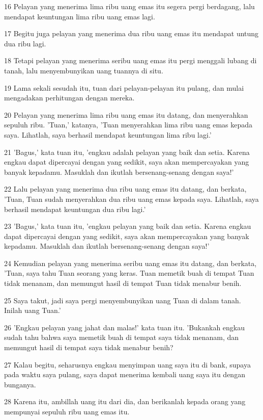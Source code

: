 \par 16 Pelayan yang menerima lima ribu uang emas itu segera pergi berdagang, lalu mendapat keuntungan lima ribu uang emas lagi.
\par 17 Begitu juga pelayan yang menerima dua ribu uang emas itu mendapat untung dua ribu lagi.
\par 18 Tetapi pelayan yang menerima seribu uang emas itu pergi menggali lubang di tanah, lalu menyembunyikan uang tuannya di situ.
\par 19 Lama sekali sesudah itu, tuan dari pelayan-pelayan itu pulang, dan mulai mengadakan perhitungan dengan mereka.
\par 20 Pelayan yang menerima lima ribu uang emas itu datang, dan menyerahkan sepuluh ribu. 'Tuan,' katanya, 'Tuan menyerahkan lima ribu uang emas kepada saya. Lihatlah, saya berhasil mendapat keuntungan lima ribu lagi.'
\par 21 'Bagus,' kata tuan itu, 'engkau adalah pelayan yang baik dan setia. Karena engkau dapat dipercayai dengan yang sedikit, saya akan mempercayakan yang banyak kepadamu. Masuklah dan ikutlah bersenang-senang dengan saya!'
\par 22 Lalu pelayan yang menerima dua ribu uang emas itu datang, dan berkata, 'Tuan, Tuan sudah menyerahkan dua ribu uang emas kepada saya. Lihatlah, saya berhasil mendapat keuntungan dua ribu lagi.'
\par 23 'Bagus,' kata tuan itu, 'engkau pelayan yang baik dan setia. Karena engkau dapat dipercayai dengan yang sedikit, saya akan mempercayakan yang banyak kepadamu. Masuklah dan ikutlah bersenang-senang dengan saya!'
\par 24 Kemudian pelayan yang menerima seribu uang emas itu datang, dan berkata, 'Tuan, saya tahu Tuan seorang yang keras. Tuan memetik buah di tempat Tuan tidak menanam, dan memungut hasil di tempat Tuan tidak menabur benih.
\par 25 Saya takut, jadi saya pergi menyembunyikan uang Tuan di dalam tanah. Inilah uang Tuan.'
\par 26 'Engkau pelayan yang jahat dan malas!' kata tuan itu. 'Bukankah engkau sudah tahu bahwa saya memetik buah di tempat saya tidak menanam, dan memungut hasil di tempat saya tidak menabur benih?
\par 27 Kalau begitu, seharusnya engkau menyimpan uang saya itu di bank, supaya pada waktu saya pulang, saya dapat menerima kembali uang saya itu dengan bunganya.
\par 28 Karena itu, ambillah uang itu dari dia, dan berikanlah kepada orang yang mempunyai sepuluh ribu uang emas itu.
